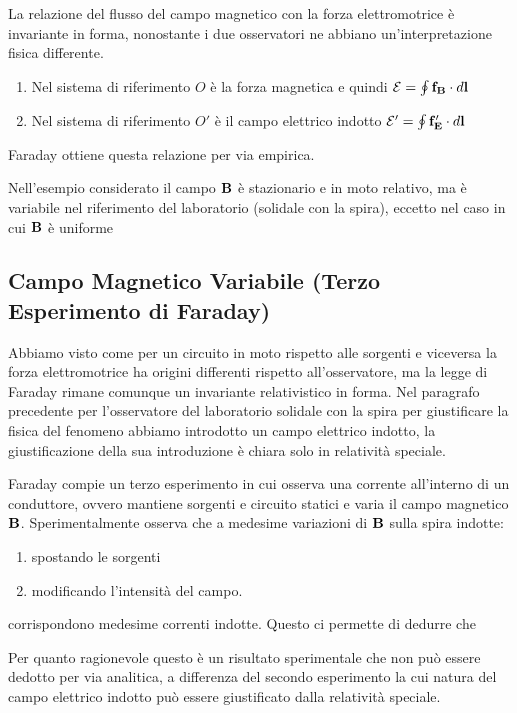La relazione del flusso del campo magnetico con la forza elettromotrice \`e  invariante in forma, nonostante i due osservatori ne abbiano un'interpretazione fisica differente.
\begin{enumerate}
	\item Nel sistema di riferimento $O$ \`e la forza magnetica e quindi $\mathcal{E}= \oint \bold{f_B} \cdot d \bold{l} $ 
	\item Nel sistema di riferimento $O'$ \`e il campo elettrico indotto $\mathcal{E}' = \oint \bold{f_E'} \cdot d \bold{l}$
\end{enumerate}
\begin{center}
 \end{center}
 Faraday ottiene questa relazione per via empirica. 
\begin{remark}

 Nell'esempio considerato il campo $\bold{B}$ \`e stazionario e in moto relativo, ma \`e variabile nel riferimento del laboratorio (solidale con la spira), eccetto nel caso in cui $\bold{B}$ \`e uniforme 
\end{remark}

\subsection{Campo Magnetico Variabile (Terzo Esperimento di Faraday)}

Abbiamo visto come per un circuito in moto rispetto alle sorgenti e viceversa la forza elettromotrice ha origini differenti rispetto all'osservatore, ma la legge di Faraday rimane comunque un invariante relativistico in forma. Nel paragrafo precedente per l'osservatore del laboratorio solidale con la spira per giustificare la fisica del fenomeno abbiamo introdotto un campo elettrico indotto, la giustificazione della sua introduzione \`e chiara solo in relativit\`a speciale.

Faraday compie un terzo esperimento in cui osserva una corrente all'interno di un conduttore, ovvero mantiene sorgenti e circuito statici e varia il campo magnetico $\bold{B}$. Sperimentalmente osserva che a medesime variazioni di $\bold{B}$ sulla spira indotte:
\begin{enumerate}
	\item spostando le sorgenti 
	\item modificando l'intensit\`a del campo.
\end{enumerate} 
corrispondono medesime correnti indotte. Questo ci permette di dedurre che 
\begin{center}
\end{center}
Per quanto ragionevole questo \`e un risultato sperimentale che non pu\`o essere dedotto per via analitica, a differenza del secondo esperimento la cui natura del campo elettrico indotto pu\`o essere giustificato dalla relativit\`a speciale.

